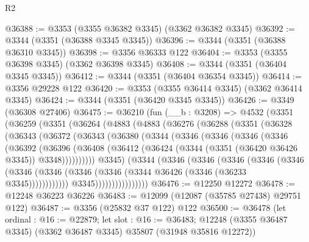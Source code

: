 \begin{lexlean}{R2}
\begin{coremodule}
@36388 := @3353 (@3355 @36382 @3345) (@3362 @36382 @3345)
@36392 := @3344 (@3351 (@36388 @3345 @3345))
@36396 := @3344 (@3351 (@36388 @36310 @3345))
@36398 := @3356 @36333 @122
@36404 := @3353 (@3355 @36398 @3345) (@3362 @36398 @3345)
@36408 := @3344 (@3351 (@36404 @3345 @3345))
@36412 := @3344 (@3351 (@36404 @36354 @3345))
@36414 := @3356 @29228 @122
@36420 := @3353 (@3355 @36414 @3345) (@3362 @36414 @3345)
@36424 := @3344 (@3351 (@36420 @3345 @3345))
@36426 := @3349 (@36308 @27406)
@36475 := @36210
    (fun (__b : @3208) =>
    @4532
      (@3351
        (@36259
          (@3351
            (@36264
              (@4883
                (@4883
                  (@36276
                    (@36288
                      (@3351
                        (@36328
                          (@36343
                            (@36372
                              (@36343
                                (@36380
                                  (@3344
                                    (@3346
                                      (@3346
                                        (@3346
                                          (@3346
                                            (@36392
                                              (@36396
                                                (@36408
                                                  (@36412
                                                    (@36424
                                                      (@3344
                                                        (@3351 (@36420 @36426 @3345))
                                                        @3348))))))))))
                                    @3345)
                                  (@3344
                                    (@3346
                                      (@3346
                                        (@3346
                                          (@3346
                                            (@3346
                                              (@3346
                                                (@3346
                                                  (@3346
                                                    (@3346
                                                      (@3344 @36426 (@3346 (@36233 @3345))))))))))))
                                    @3345))))))))))))))))
@36476 := @12250 @12272
@36478 := @12248 @36223 @36226
@36483 := @12099 (@12087 (@35785 @27438) @29751 @122)
@36487 := @3356 (@25832 @37 @122) @122
@36500 := @36478
    (let ordinal : @16 := @22879;
    let slot : @16 := @36483;
    @12248 (@3355 @36487 @3345) (@3362 @36487 @3345) @35807 (@31948 @35816 @12272))

\end{coremodule}
\end{lexlean}
